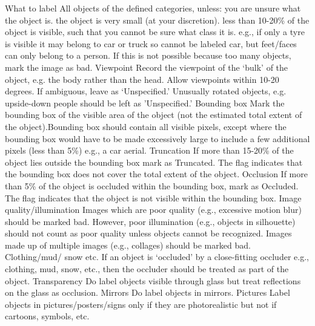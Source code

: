 \begin{outline}
    \1 What to label
       \2 All objects of the defined categories, unless:
        \3 you are unsure what the object is.
        \3 the object is very small (at your discretion).
        \3 less than 10-20\% of the object is visible, such that you cannot be sure what class it is. e.g., if only a tyre is visible it may belong to car or truck so cannot be labeled car, but feet/faces can only belong to a person.
      \2If this is not possible because too many objects, mark the image as bad.
    \1 Viewpoint
       \2 Record the viewpoint of the ‘bulk’ of the object, e.g. the body rather than the head.  Allow viewpoints within 10-20 degrees. If ambiguous, leave as ‘Unspecified.’ Unusually rotated objects, e.g. upside-down people should be left as 'Unspecified.'
    \1 Bounding box
       \2 Mark the bounding box of the visible area of the object (not the estimated total extent of the object).Bounding box should contain all visible pixels, except where the bounding box would have to be made excessively large to include a few additional pixels (less than 5\%) e.g., a car aerial.
    \1 Truncation
       \2 If more than 15-20\% of the object lies outside the bounding box mark as Truncated. The flag indicates that the bounding box does not cover the total extent of the object.
    \1 Occlusion
       \2If more than 5\% of the object is occluded within the bounding box, mark as Occluded. The flag indicates that the object is not visible within the bounding box.
    \1 Image quality/illumination
       \2 Images which are poor quality (e.g., excessive motion blur) should be marked bad.  However, poor illumination (e.g., objects in silhouette) should not count as poor quality unless objects cannot be recognized. Images made up of multiple images (e.g., collages) should be marked bad.
    \1 Clothing/mud/ snow etc.
       \2 If an object is ‘occluded’ by a close-fitting occluder e.g., clothing, mud, snow, etc., then the occluder should be treated as part of the object.
    \1 Transparency
       \2 Do label objects visible through glass but treat reflections on the glass as occlusion.
    \1 Mirrors
       \2 Do label objects in mirrors.
    \1 Pictures
       \2 Label objects in pictures/posters/signs only if they are photorealistic but not if cartoons, symbols, etc.
\end{outline}

